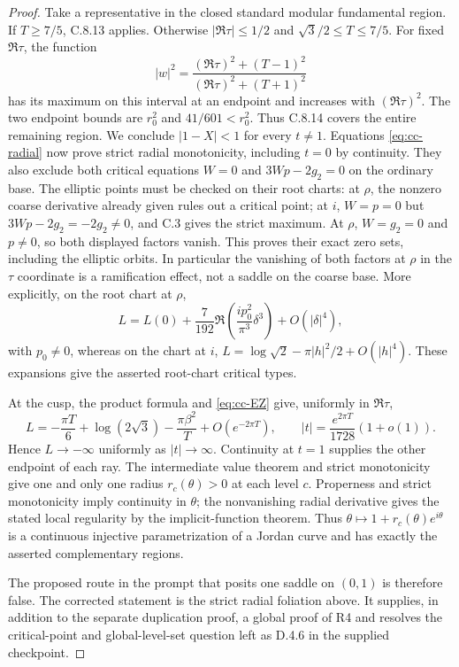 \begin{proof}
Take a representative in the closed standard modular fundamental
region. If $T\ge7/5$, C.8.13 applies. Otherwise
$|\Re\tau|\le1/2$ and $\sqrt3/2\le T\le7/5$. For fixed
$\Re\tau$, the function
\[
 |w|^2=\frac{(\Re\tau)^2+(T-1)^2}
                    {(\Re\tau)^2+(T+1)^2}
\]
has its maximum on this interval at an endpoint and increases
with $(\Re\tau)^2$. The two endpoint bounds are $r_0^2$
and $41/601<r_0^2$. Thus C.8.14 covers the entire remaining
region. We conclude $|1-X|<1$ for every $t\ne1$.
Equations \eqref{eq:cc-radial} now prove strict radial
monotonicity, including $t=0$ by continuity. They also exclude
both critical equations $W=0$ and $3Wp-2g_2=0$ on the
ordinary base. The elliptic points must be checked on their
root charts: at $\rho$, the nonzero coarse derivative already
given rules out a critical point; at $i$, $W=p=0$ but $3Wp-2g_2=-2g_2\ne0$, and C.3 gives
the strict maximum. At $\rho$, $W=g_2=0$ and $p\ne0$,
so both displayed factors vanish. This proves their exact zero
sets, including the elliptic orbits. In particular the vanishing of both factors at
$\rho$ in the $\tau$ coordinate is a ramification effect,
not a saddle on the coarse base. More explicitly, on the root
chart at $\rho$,
\[
 L=L(0)+\frac7{192}\Re\left(\frac{ip_0^2}{\pi^3}\delta^3\right)
                   +O(|\delta|^4),
\]
with $p_0\ne0$, whereas on the chart at $i$,
$L=\log\sqrt2-\pi|h|^2/2+O(|h|^4)$.
These expansions give the asserted root-chart critical types.

At the cusp, the product formula and \eqref{eq:cc-EZ} give,
uniformly in $\Re\tau$,
\[
 L=-\frac{\pi T}{6}+\log(2\sqrt3)-
                      \frac{\pi\beta^2}{T}+O(e^{-2\pi T}),
 \qquad |t|=\frac{e^{2\pi T}}{1728}(1+o(1)).
\]
Hence $L\to-\infty$ uniformly as $|t|\to\infty$.
Continuity at $t=1$ supplies the other endpoint of each ray.
The intermediate value theorem and strict monotonicity give
one and only one radius $r_c(\theta)>0$ at each level $c$.
Properness and strict monotonicity imply continuity in $\theta$;
the nonvanishing radial derivative gives the stated local
regularity by the implicit-function theorem. Thus
$\theta\mapsto1+r_c(\theta)e^{i\theta}$ is a continuous
injective parametrization of a Jordan curve and has exactly
the asserted complementary regions.

The proposed route in the prompt that posits one saddle on
$(0,1)$ is therefore false. The corrected statement is the
strict radial foliation above. It supplies, in addition to
the separate duplication proof, a global proof of R4 and
resolves the critical-point and global-level-set question
left as D.4.6 in the supplied checkpoint.
\end{proof}
